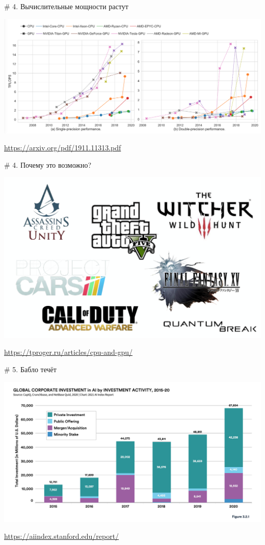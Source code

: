 \documentclass[notes,12pt, aspectratio=169]{beamer}
\begin{document}
\begin{frame}{\# 4. Вычислительные мощности растут}
\begin{center}
	\includegraphics[width=.95\linewidth]{gpu_perf_trends.png}
\end{center}
\vfill %
\footnotesize
\color{blue} \url{https://arxiv.org/pdf/1911.11313.pdf}
\end{frame} 


\begin{frame}{\# 4. Почему это возможно?}
\begin{center}
	\includegraphics[width=.6\linewidth]{trend42.png}
\end{center}
\vfill %
\footnotesize
\color{blue} \url{https://tproger.ru/articles/cpu-and-gpu/}
\end{frame} 


\begin{frame}{\# 5. Бабло течёт}
\begin{center}
	\includegraphics[width=.85\linewidth]{investment.png}
\end{center}
\vfill %
\footnotesize
\color{blue} \url{https://aiindex.stanford.edu/report/}
\end{frame} 
\end{document}
